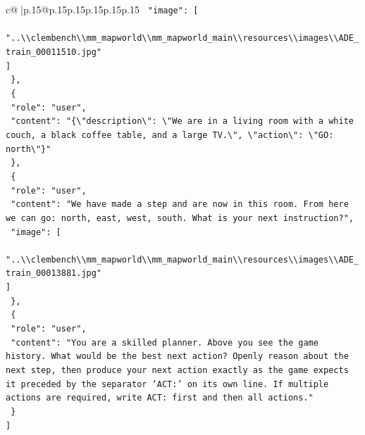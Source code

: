 \documentclass{article}
\begin{document}
{\begin{supertabular}{c@{$\;$}|p{.15\linewidth}@{}p{.15\linewidth}p{.15\linewidth}p{.15\linewidth}p{.15\linewidth}p{.15\linewidth}}
{{{\texttt{    "image": {[}} \\
\texttt{      "..\textbackslash{}\textbackslash{}clembench\textbackslash{}\textbackslash{}mm\_mapworld\textbackslash{}\textbackslash{}mm\_mapworld\_main\textbackslash{}\textbackslash{}resources\textbackslash{}\textbackslash{}images\textbackslash{}\textbackslash{}ADE\_train\_00011510.jpg"} \\
\texttt{    {]}} \\
\texttt{  \},} \\
\texttt{  \{} \\
\texttt{    "role": "user",} \\
\texttt{    "content": "\{\textbackslash{}"description\textbackslash{}": \textbackslash{}"We are in a living room with a white couch, a black coffee table, and a large TV.\textbackslash{}", \textbackslash{}"action\textbackslash{}": \textbackslash{}"GO: north\textbackslash{}"\}"} \\
\texttt{  \},} \\
\texttt{  \{} \\
\texttt{    "role": "user",} \\
\texttt{    "content": "We have made a step and are now in this room. From here we can go: north, east, west, south. What is your next instruction?",} \\
\texttt{    "image": {[}} \\
\texttt{      "..\textbackslash{}\textbackslash{}clembench\textbackslash{}\textbackslash{}mm\_mapworld\textbackslash{}\textbackslash{}mm\_mapworld\_main\textbackslash{}\textbackslash{}resources\textbackslash{}\textbackslash{}images\textbackslash{}\textbackslash{}ADE\_train\_00013881.jpg"} \\
\texttt{    {]}} \\
\texttt{  \},} \\
\texttt{  \{} \\
\texttt{    "role": "user",} \\
\texttt{    "content": "You are a skilled planner. Above you see the game history. What would be the best next action? Openly reason about the next step, then produce your next action exactly as the game expects it preceded by the separator 'ACT:' on its own line. If multiple actions are required, write ACT: first and then all actions."} \\
\texttt{  \}} \\
\texttt{{]}} \\
            }
        }
    }
     \\ \\


\end{supertabular}}
\end{document}
